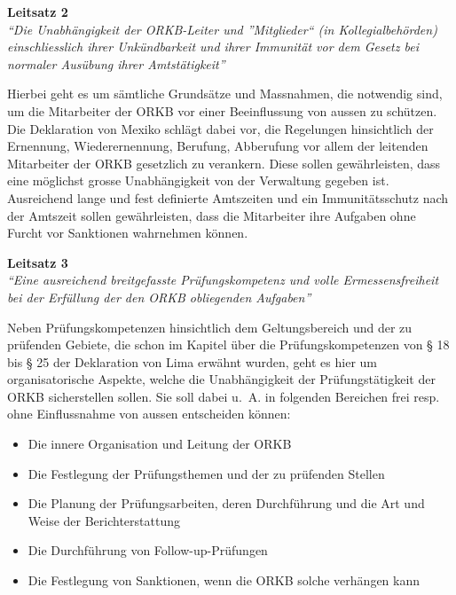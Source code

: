 \documentclass[10pt]{article}
\begin{document}
\textbf{Leitsatz 2}\label{Leitsatz 2} \\
\textit{“{}Die Unabhängigkeit der ORKB-Leiter und ”{}Mitglieder“{} (in Kollegialbehörden) einschliesslich ihrer Unkündbarkeit und ihrer Immunität vor dem Gesetz bei normaler Ausübung ihrer Amtstätigkeit”{}}

Hierbei geht es um sämtliche Grundsätze und Massnahmen, die notwendig sind, um die Mitarbeiter der ORKB vor einer Beeinflussung von aussen zu schützen. Die Deklaration von Mexiko schlägt dabei vor, die Regelungen hinsichtlich der Ernennung, Wiederernennung, Berufung, Abberufung vor allem der leitenden Mitarbeiter der ORKB gesetzlich zu verankern. Diese sollen gewährleisten, dass eine möglichst grosse Unabhängigkeit von der Verwaltung gegeben ist. Ausreichend lange und fest definierte Amtszeiten und ein Immunitätsschutz nach der Amtszeit sollen gewährleisten, dass die Mitarbeiter ihre Aufgaben ohne Furcht vor Sanktionen wahrnehmen können.

\textbf{Leitsatz 3}\\
\textit{“{}Eine ausreichend breitgefasste Prüfungskompetenz und volle Ermessensfreiheit bei der Erfüllung der den ORKB obliegenden Aufgaben”{}}

Neben Prüfungskompetenzen hinsichtlich dem Geltungsbereich und der zu prüfenden Gebiete, die schon im Kapitel über die Prüfungskompetenzen von § 18 bis § 25 der Deklaration von Lima erwähnt wurden, geht es hier um organisatorische Aspekte, welche die Unabhängigkeit der Prüfungstätigkeit der ORKB sicherstellen sollen. Sie soll dabei u.~A. in folgenden Bereichen frei resp. ohne Einflussnahme von aussen entscheiden können:

\begin{itemize}
    \item Die innere Organisation und Leitung der ORKB

    \item Die Festlegung der Prüfungsthemen und der zu prüfenden Stellen

    \item Die Planung der Prüfungsarbeiten, deren Durchführung und die Art und Weise der Berichterstattung

    \item Die Durchführung von Follow-up-Prüfungen

    \item Die Festlegung von Sanktionen, wenn die ORKB solche verhängen kann

\end{itemize}
\end{document}
